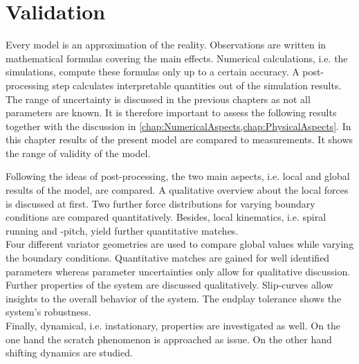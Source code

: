 \chapter{Validation} \label{chap:Validation}
Every model is an approximation of the reality.
Observations are written in mathematical formulas covering the main effects.
Numerical calculations, i.e. the simulations, compute these formulas only up to a certain accuracy.
A post-processing step calculates interpretable quantities out of the simulation results.\\
The range of uncertainty is discussed in the previous chapters as not all parameters are known.
It is therefore important to assess the following results together with the discussion in \cref{chap:NumericalAspects,chap:PhysicalAspects}.
In this chapter results of the present model are compared to measurements.
It shows the range of validity of the model.\par

Following the ideas of post-processing, the two main aspects, i.e. local and global results of the model, are compared.
A qualitative overview about the local forces is discussed at first.
Two further force distributions for varying boundary conditions are compared quantitatively.
Besides, local kinematics, i.e. spiral running and \el-\sheave pitch, yield further quantitative matches.\\
Four different variator geometries are used to compare global values while varying the boundary conditions.
Quantitative matches are gained for well identified parameters whereas parameter uncertainties only allow for qualitative discussion.
Further properties of the system are discussed qualitatively.
Slip-curves allow insights to the overall behavior of the system.
The endplay tolerance shows the system's robustness.\\
Finally, dynamical, i.e. instationary, properties are investigated as well.
On the one hand the scratch phenomenon is approached as \NVH issue.
On the other hand shifting dynamics are studied.